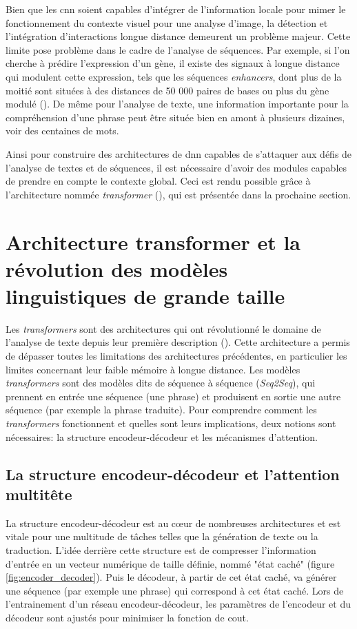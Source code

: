 Bien que les \gls{cnn} soient capables d'intégrer de l'information locale pour mimer le fonctionnement du contexte visuel pour une analyse d'image, la détection et l'intégration d'interactions longue distance demeurent un problème majeur. Cette limite pose problème dans le cadre de l'analyse de séquences. Par exemple, si l’on cherche à prédire l'expression d'un gène, il existe des signaux à longue distance qui modulent cette expression, tels que les séquences \textit{enhancers}, dont plus de la moitié sont situées à des distances de 50 000 paires de bases ou plus du gène modulé (\cite{chepelev_characterization_2012}). De même pour l'analyse de texte, une information importante pour la compréhension d'une phrase peut être située bien en amont à plusieurs dizaines, voir des centaines de mots.

Ainsi pour construire des architectures de \gls{dnn} capables de s'attaquer aux défis de l'analyse de textes et de séquences, il est nécessaire d'avoir des modules capables de prendre en compte le contexte global. Ceci est rendu possible grâce à l'architecture nommée \textit{transformer} (\cite{vaswani_attention_2017}), qui est présentée dans la prochaine section.


\section{Architecture transformer et la révolution des modèles linguistiques de grande taille}
Les \textit{transformers} sont des architectures qui ont révolutionné le domaine de l'analyse de texte depuis leur première description (\cite{vaswani_attention_2017}). Cette architecture a permis de dépasser toutes les limitations des architectures précédentes, en particulier les limites concernant leur faible mémoire à longue distance. Les modèles \textit{transformers} sont des modèles dits de séquence à séquence (\textit{Seq2Seq}), qui prennent en entrée une séquence (une phrase) et produisent en sortie une autre séquence (par exemple la phrase traduite). Pour comprendre comment les \textit{transformers} fonctionnent et quelles sont leurs implications, deux notions sont nécessaires: la structure encodeur-décodeur et les mécanismes d'attention.

\subsection{La structure encodeur-décodeur et l'attention multitête}
La structure encodeur-décodeur est au cœur de nombreuses architectures et est vitale pour une multitude de tâches telles que la génération de texte ou la traduction. L'idée derrière cette structure est de compresser l'information d'entrée en un vecteur numérique de taille définie, nommé "état caché" (figure \ref{fig:encoder_decoder}). Puis le décodeur, à partir de cet état caché, va générer une séquence (par exemple une phrase) qui correspond à cet état caché. Lors de l'entrainement d'un réseau encodeur-décodeur, les paramètres de l'encodeur et du décodeur sont ajustés pour minimiser la fonction de cout. 


